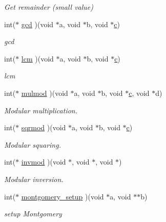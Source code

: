 \begin{DoxyCompactItemize}
\begin{DoxyCompactList}\small\item\em Get remainder (small value) \end{DoxyCompactList}\item 
int($\ast$ \mbox{\hyperlink{structltc__math__descriptor_a2cac3e41594eeb13e40841ee30c8d476}{gcd}} )(void $\ast$a, void $\ast$b, void $\ast$\mbox{\hyperlink{khazad_8c_a86ea50de5a3e0ae87762f4298d35284c}{c}})
\begin{DoxyCompactList}\small\item\em gcd \end{DoxyCompactList}\item 
int($\ast$ \mbox{\hyperlink{structltc__math__descriptor_a3259308dc6b547a475ed53506590f4ec}{lcm}} )(void $\ast$a, void $\ast$b, void $\ast$\mbox{\hyperlink{khazad_8c_a86ea50de5a3e0ae87762f4298d35284c}{c}})
\begin{DoxyCompactList}\small\item\em lcm \end{DoxyCompactList}\item 
int($\ast$ \mbox{\hyperlink{structltc__math__descriptor_a4be8c3cd23da49dd7bd0fc77860ebf4e}{mulmod}} )(void $\ast$a, void $\ast$b, void $\ast$\mbox{\hyperlink{khazad_8c_a86ea50de5a3e0ae87762f4298d35284c}{c}}, void $\ast$d)
\begin{DoxyCompactList}\small\item\em Modular multiplication. \end{DoxyCompactList}\item 
int($\ast$ \mbox{\hyperlink{structltc__math__descriptor_ac3bd23fc614e9b3cc990b810700bc78a}{sqrmod}} )(void $\ast$a, void $\ast$b, void $\ast$\mbox{\hyperlink{khazad_8c_a86ea50de5a3e0ae87762f4298d35284c}{c}})
\begin{DoxyCompactList}\small\item\em Modular squaring. \end{DoxyCompactList}\item 
int($\ast$ \mbox{\hyperlink{structltc__math__descriptor_a49591ee15093ebd18983a557fa9df096}{invmod}} )(void $\ast$, void $\ast$, void $\ast$)
\begin{DoxyCompactList}\small\item\em Modular inversion. \end{DoxyCompactList}\item 
int($\ast$ \mbox{\hyperlink{structltc__math__descriptor_ab371384383f0e671c6211d6b0e439f3d}{montgomery\+\_\+setup}} )(void $\ast$a, void $\ast$$\ast$b)
\begin{DoxyCompactList}\small\item\em setup Montgomery \end{DoxyCompactList}\item 
$$
\end{DoxyCompactItemize}
